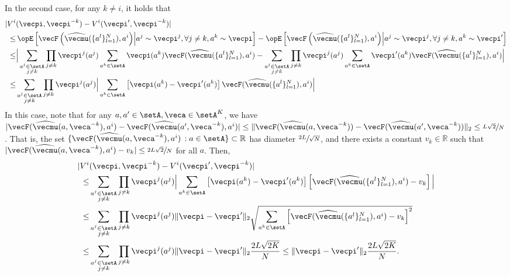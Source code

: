In the second case, for any $k \neq i$, it holds that
\begin{align*}
|V^i&(\vecpi, \vecpi^{-k}) - V^i (\vecpi', \vecpi^{-k})| \\
    \leq & \Exop \left[ \vecF\left(\widehat{\vecmu}(\{a^l\}_{l=1}^N), a^i\right) \middle|
a^j \sim \vecpi^j, \forall j \neq k, a^k \sim \vecpi
\right] - \Exop \left[ \vecF\left(\widehat{\vecmu}(\{a^l\}_{l=1}^N),a^i\right) \middle|
a^j \sim \vecpi^j, \forall j \neq k, a^k \sim \vecpi' \right] \\
    \leq & \Big| \sum_{\substack{a^j \in \setA \\ j\neq k}} \prod_{j\neq k} \vecpi^j(a^j) \sum_{a^k \in \setA}\vecpi(a^k) \vecF(\widehat{\vecmu}(\{a^l\}_{l=1}^N), a^i) - \sum_{\substack{a^j \in \setA \\ j\neq k}} \prod_{j\neq k} \vecpi^j(a^j) \sum_{a^k \in \setA} \vecpi'(a^k) \vecF(\widehat{\vecmu}(\{a^l\}_{l=1}^N), a^i) \Big| \\
\leq & \sum_{\substack{a^j \in \setA \\ j\neq k}} \prod_{j\neq k} \vecpi^j(a^j) \Big|\sum_{a^k \in \setA}\left[ \vecpi(a^k) - \vecpi'(a^k)\right] \vecF(\widehat{\vecmu}(\{a^l\}_{l=1}^N), a^i) \Big|
\end{align*}
In this case, note that for any $a, a' \in \setA, \veca\in \setA^K$, we have $|\vecF(\widehat{\vecmu}(a, \veca^{-k}), a^i) - \vecF(\widehat{\vecmu}(a', \veca^{-k}), a^i)| \leq \|\vecF(\widehat{\vecmu}(a, \veca^{-k})) - \vecF(\widehat{\vecmu}(a', \veca^{-k})) \|_2 \leq \sfrac{L\sqrt{2}}{N}$.
That is, the set $\{\vecF(\widehat{\vecmu}(a, \veca^{-k}), a^i) \, : a\in\setA \} \subset \mathbb{R}$ has diameter $\sfrac{2L}{\sqrt{N}}$, and
there exists a constant $v_{k} \in \mathbb{R}$ such that $|\vecF(\widehat{\vecmu}(a, \veca^{-k}), a^i) - v_{k}| \leq \sfrac{2L\sqrt{2}}{N}$ for all $a$.
Then,
\begin{align*}
|V^i&(\vecpi, \vecpi^{-k}) - V^i (\vecpi', \vecpi^{-k})| \\
    \leq & \sum_{\substack{a^j \in \setA \\ j\neq k}} \prod_{j\neq k} \vecpi^j(a^j) \Big|\sum_{a^k \in \setA}\left[ \vecpi(a^k) - \vecpi'(a^k)\right] \left[ \vecF(\widehat{\vecmu}(\{a^l\}_{l=1}^N), a^i) - v_{k}\right] \Big| \\
    \leq & \sum_{\substack{a^j \in \setA \\ j\neq k}} \prod_{j\neq k} \vecpi^j(a^j) \|\vecpi - \vecpi'\|_2 \sqrt{\sum_{a^k\in \setA} \left[ \vecF(\widehat{\vecmu}(\{a^l\}_{l=1}^N), a^i) - v_{k}\right]^2 } \\
    \leq & \sum_{\substack{a^j \in \setA \\ j\neq k}} \prod_{j\neq k} \vecpi^j(a^j) \|\vecpi - \vecpi'\|_2 \frac{2L\sqrt{2K}}{N} \leq \|\vecpi - \vecpi'\|_2 \frac{2L \sqrt{2K}}{N}.
\end{align*}

